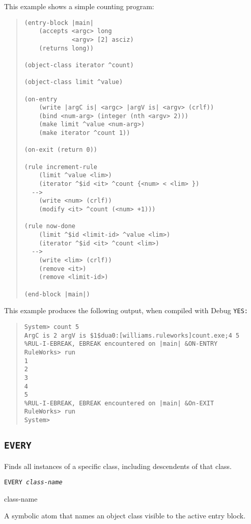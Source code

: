 This example shows a simple counting program:
\begin{quote}
\begin{verbatim}
(entry-block |main|
    (accepts <argc> long
             <argv> [2] asciz)
    (returns long))

(object-class iterator ^count)

(object-class limit ^value)

(on-entry
    (write |argC is| <argc> |argV is| <argv> (crlf))
    (bind <num-arg> (integer (nth <argv> 2)))
    (make limit ^value <num-arg>)
    (make iterator ^count 1))

(on-exit (return 0))

(rule increment-rule
    (limit ^value <lim>)
    (iterator ^$id <it> ^count {<num> < <lim> })
  -->
    (write <num> (crlf))
    (modify <it> ^count (<num> +1)))

(rule now-done
    (limit ^$id <limit-id> ^value <lim>)
    (iterator ^$id <it> ^count <lim>)
  -->
    (write <lim> (crlf))
    (remove <it>)
    (remove <limit-id>)

(end-block |main|)
\end{verbatim}
\end{quote}

This example produces the following output, when compiled with
Debug \tt{YES}:
\begin{quote}
\begin{verbatim}
System> count 5
ArgC is 2 argV is $1$dua0:[williams.ruleworks]count.exe;4 5
%RUL-I-EBREAK, EBREAK encountered on |main| &ON-ENTRY
RuleWorks> run
1
2
3
4
5
%RUL-I-EBREAK, EBREAK encountered on |main| &On-EXIT
RuleWorks> run
System>
\end{verbatim}
\end{quote}


\subsection{\tt{EVERY}}

Finds all instances of a specific class, including descendents of that
class.

\Format

\tt{EVERY} \it{class-name}

\begin{arguments}
\item[class-name]

  A symbolic atom that names an object class visible to the active
  entry block.
\end{arguments}


